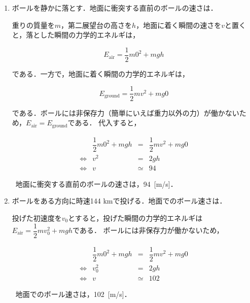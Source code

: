 \documentclass[a4paper,11pt]{ltjsarticle}
\begin{document}
\begin{enumerate}
  \item ボールを静かに落とす．地面に衝突する直前のボールの速さは．


  重りの質量を$m$，第二展望台の高さを$h$，地面に着く瞬間の速さを$v$と置くと，落とした瞬間の力学的エネルギは，

  \begin{equation}
    E_{\mathrm{air}} = \dfrac{1}{2}m0^2 + mgh
  \end{equation}

  である．一方で，地面に着く瞬間の力学的エネルギは，

  \begin{equation}
    E_{\mathrm{ground}} = \dfrac{1}{2}mv^2 + mg0
  \end{equation}

  である．ボールには非保存力（簡単にいえば重力以外の力）が働かないため，$E_{\mathrm{air}} = E_{\mathrm{ground}}$である．
  代入すると，

  \begin{equation}
  \renewcommand{\arraystretch}{2.5}
    \begin{array}{crcl}
      & \dfrac{1}{2}m0^2 + mgh &=& \dfrac{1}{2}mv^2 + mg0 \\
      \Leftrightarrow & v^2 &=& 2gh \\
      \Leftrightarrow & v &\simeq& 94
    \end{array}
  \end{equation}

  \therefore\ 地面に衝突する直前のボールの速さは，94\ [m/s]．

  \item ボールをある方向に時速144 kmで投げる．地面でのボール速さは．


  投げた初速度を$v_0$とすると，投げた瞬間の力学的エネルギは$E_{\mathrm{air}} = \dfrac{1}{2}mv_0^2 +mgh$である．
  ボールには非保存力が働かないため，

  \begin{equation}
  \renewcommand{\arraystretch}{2.5}
    \begin{array}{crcl}
      & \dfrac{1}{2}m0^2 + mgh &=& \dfrac{1}{2}mv^2 + mg0 \\
      \Leftrightarrow & v_0^2 &=& 2gh \\
      \Leftrightarrow & v &\simeq& 102
    \end{array}
  \end{equation}

  \therefore\ 地面でのボール速さは，102\ [m/s]．

\end{enumerate}
\end{document}
